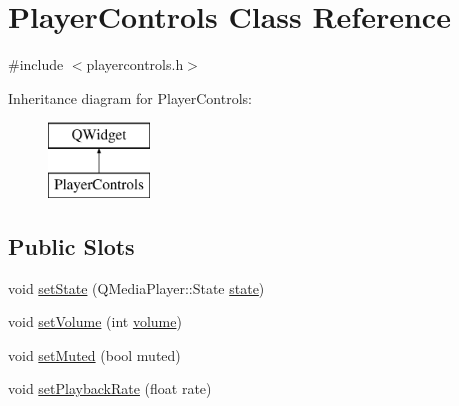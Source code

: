 \hypertarget{class_player_controls}{\section{Player\-Controls Class Reference}
\label{class_player_controls}
}


{\ttfamily \#include $<$playercontrols.\-h$>$}

Inheritance diagram for Player\-Controls\-:\begin{figure}[H]
\begin{center}
\leavevmode
\includegraphics[height=2.000000cm]{class_player_controls}
\end{center}
\end{figure}
\subsection*{Public Slots}
\begin{DoxyCompactItemize}
\item 
void \hyperlink{class_player_controls_a3f893f8f7a76a9923b7a00c3608a3a29}{set\-State} (Q\-Media\-Player\-::\-State \hyperlink{class_player_controls_a2c767433c197631836b4f757f3d5cceb}{state})
\item 
void \hyperlink{class_player_controls_a99fa40918c2bb0adb02a4c06bdf427a6}{set\-Volume} (int \hyperlink{class_player_controls_aa5b799627701db4d8c7d6165a43590be}{volume})
\item 
void \hyperlink{class_player_controls_ac2e2269194c68754031a8460c14c00b9}{set\-Muted} (bool muted)
\item 
void \hyperlink{class_player_controls_a193c465aa9d4eb3cbdf564f7701a5d46}{set\-Playback\-Rate} (float rate)
\end{DoxyCompactItemize}
